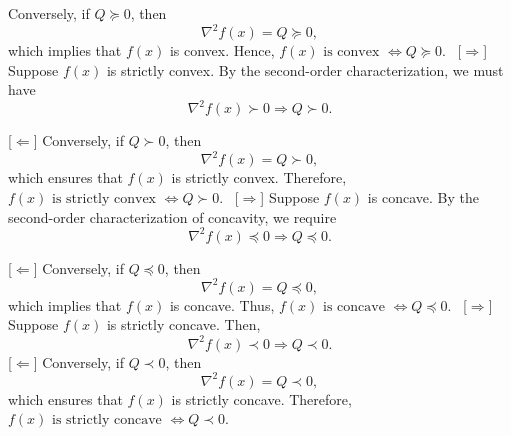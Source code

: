\documentclass[solution,addpoints,12pt]{exam}
\begin{document}
\begin{questions}
\begin{parts}
\begin{solution}
\begin{subparts}
		[$\Leftarrow$] Conversely, if $Q \succeq 0$, then
		\[
		\nabla^2 f(x) = Q \succeq 0,
		\]
		which implies that $f(x)$ is convex.  
		Hence,
		$
		f(x) \text{ is convex } \Leftrightarrow Q \succeq 0.
		$
		\subpart~[$\Rightarrow$] Suppose $f(x)$ is strictly convex.  
		By the second-order characterization, we must have
		\[
		\nabla^2 f(x) \succ 0 \Rightarrow Q \succ 0.
		\]
		
		[$\Leftarrow$] Conversely, if $Q \succ 0$, then
		\[
		\nabla^2 f(x) = Q \succ 0,
		\]
		which ensures that $f(x)$ is strictly convex.  
		Therefore,
		$
		f(x) \text{ is strictly convex } \Leftrightarrow Q \succ 0.
		$	
		\subpart~[$\Rightarrow$] Suppose $f(x)$ is concave.  
		By the second-order characterization of concavity, we require
		\[
		\nabla^2 f(x) \preceq 0 \Rightarrow Q \preceq 0.
		\]
		
		[$\Leftarrow$] Conversely, if $Q \preceq 0$, then
		\[
		\nabla^2 f(x) = Q \preceq 0,
		\]
		which implies that $f(x)$ is concave.  
		Thus,
		$
		f(x) \text{ is concave } \Leftrightarrow Q \preceq 0.
		$
		\subpart~[$\Rightarrow$] Suppose $f(x)$ is strictly concave.  
		Then,
		\[
		\nabla^2 f(x) \prec 0 \Rightarrow Q \prec 0.
		\]
		[$\Leftarrow$] Conversely, if $Q \prec 0$, then
		\[
		\nabla^2 f(x) = Q \prec 0,
		\]
		which ensures that $f(x)$ is strictly concave.  
		Therefore,
		$f(x) \text{ is strictly concave } \Leftrightarrow Q \prec 0.$
		
	\end{subparts}
	
	
	\noindent 
	
\end{solution}
\end{parts}


\\
\begin{parts}

\end{parts}
\end{questions}
\end{document}
